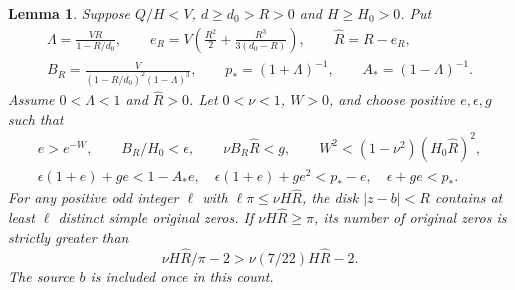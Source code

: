 \documentclass[11pt,reqno]{amsart}
\numberwithin{equation}{section}
\newtheorem{lemma}[theorem]{Lemma}
\theoremstyle{definition}
\theoremstyle{remark}
\begin{document}
\begin{lemma}\label{lt:inverse-log}\label{lt:odd-pi}
Suppose $Q/H<V$, $d\ge d_0>R>0$ and $H\ge H_0>0$. Put
\begin{gather*}
 \Lambda=\frac{VR}{1-R/d_0},\qquad
 e_R=V\left(\frac{R^2}{2}+\frac{R^3}{3(d_0-R)}\right),\qquad
 \widehat R=R-e_R,\\
 B_R=\frac{V}{(1-R/d_0)^2(1-\Lambda)^3},\qquad
 p_*=(1+\Lambda)^{-1},\qquad A_*=(1-\Lambda)^{-1}.
\end{gather*}
Assume $0<\Lambda<1$ and $\widehat R>0$. Let $0<\nu<1$, $W>0$,
and choose positive $e,\epsilon,g$ such that
\begin{gather}
 e>e^{-W},\qquad B_R/H_0<\epsilon,\qquad
 \nu B_R\widehat R<g,\qquad
 W^2<(1-\nu^2)(H_0\widehat R)^2,\label{lt:inverse-corner}\\
 \epsilon(1+e)+ge<1-A_*e,\quad
 \epsilon(1+e)+ge^2<p_*-e,\quad
 \epsilon+ge<p_*.\label{lt:inverse-sides}
\end{gather}
For any positive odd integer $\ell$ with
$\ell\pi\le\nu H\widehat R$, the disk $|z-b|<R$ contains at
least $\ell$ distinct simple original zeros. If
$\nu H\widehat R\ge\pi$, its number of original zeros is
strictly greater than
\begin{equation}\label{lt:inverse-density}
 \nu H\widehat R/\pi-2>\nu(7/22)H\widehat R-2.
\end{equation}
The source $b$ is included once in this count.
\end{lemma}
\end{document}
